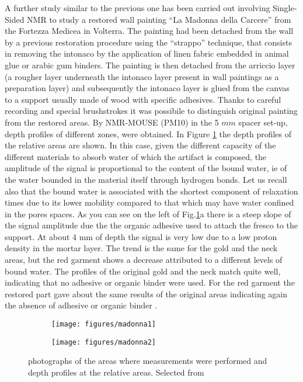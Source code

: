 \documentclass[a4paper,11pt]{report}
\begin{document}
A further study similar to the previous one has been carried out involving Single-Sided NMR to study a restored wall painting “La Madonna della Carcere” from the Fortezza Medicea in Volterra\cite{cinquefresco}. The painting had been detached from the wall by a previous restoration procedure using the “strappo” technique, that consists in removing the intonaco by the application of linen fabric embedded in animal glue or arabic gum binders. The painting is then detached from the arriccio layer (a rougher layer underneath the intonaco layer present in wall paintings as a preparation layer) and  subsequently the intonaco layer is  glued from the canvas to a support usually made of wood with specific adhesives\cite{cinquefresco}. Thanks to careful recording and special brushstrokes it was possibile to distinguish original painting from the restored areas. By NMR-MOUSE (PM10) in the 5 $mm$ spacer set-up, depth profiles of different zones, were obtained. In Figure \ref{madonna} the depth profiles of the relative areas are shown. In this case, given the different capacity of the different materials to absorb water of which the artifact is composed, the amplitude of the signal is proportional to the content of the bound water, ie of the water bounded in the material itself through hydrogen bonds. Let us recall also that the bound water is associated with the shortest component of relaxation times due to its lower mobility compared to that which may have water confined in the pores spaces. As you can see on the left of Fig.\ref{madonna}a there is a steep slope of the signal amplitude due the the organic adhesive used to attach the fresco to the support. At about 4 mm of depth the signal is very low due to a low proton density in the mortar layer. The trend is the same for the gold and the neck areas, but the red garment shows a decrease attributed to a different levels of bound water. The profiles of the original gold and the neck match quite well, indicating that no adhesive or organic binder were used. For the red garment the restored part gave about the same results of the original areas indicating again the absence of adhesive or organic binder .   
\begin{figure}[h]
	\begin{subfigure}{0.5\textwidth}
\texttt{[image: figures/madonna1]} 
\caption{}
\end{subfigure}
\begin{subfigure}{0.5\textwidth}
\texttt{[image: figures/madonna2]}
\caption{}
\end{subfigure}
\caption{photographs of the areas where measurements were performed and depth profiles at the relative areas. Selected from \cite{cinquefresco}} \label{madonna}
\end{figure}
\end{document}

